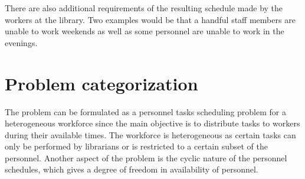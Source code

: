 There are also additional requirements of the resulting schedule made by the workers at the library. Two examples would be that a handful staff members are unable to work weekends as well as some personnel are unable to work in the evenings.

\section{Problem categorization}
The problem can be formulated as a personnel tasks scheduling problem for a heterogeneous workforce since the main objective is to distribute tasks to workers during their available times. The workforce is heterogeneous as certain tasks can only be performed by librarians or is restricted to a certain subset of the personnel. Another aspect of the problem is the cyclic nature of the personnel schedules, which gives a degree of freedom in availability of personnel.


